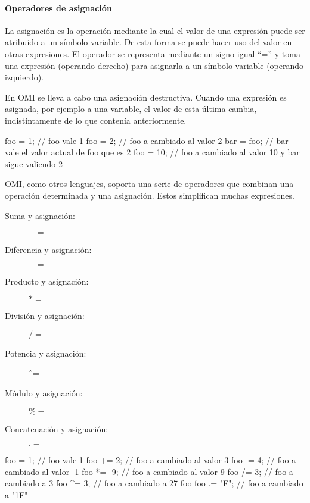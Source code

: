 \paragraph{Operadores de asignación} \label{sec:op_asig}
La asignación es la operación mediante la cual el valor de una expresión puede ser atribuido a un símbolo variable. De esta forma se puede hacer uso 
del valor en otras expresiones. El operador se representa mediante un signo igual ``='' y toma una expresión (operando derecho) para asignarla a un símbolo variable (operando izquierdo).
 

En OMI se lleva a cabo una asignación destructiva. Cuando una expresión es asignada, por ejemplo a una variable, el valor de esta última cambia, indistintamente de lo que contenía
anteriormente.\\

 \begin{myverbatim}
   foo = 1; // foo vale 1
   foo = 2; // foo a cambiado al valor 2
   bar = foo; // bar vale el valor actual de foo que es 2
   foo = 10; // foo a cambiado al valor 10 y bar sigue valiendo 2
\end{myverbatim} 

OMI, como otros lenguajes, soporta una serie de operadores que combinan una operación determinada y una asignación. Estos simplifican
muchas expresiones.

\begin{description}
\item [Suma y asignación:] $+=$
\item [Diferencia y asignación:] $-=$
\item [Producto y asignación:] $*=$
\item [División y asignación:] $/=$
\item [Potencia y asignación:] \^ \ =\hfill 
\item [Módulo y asignación:] $\%=$
\item [Concatenación y asignación:] $.=$
\end{description} 

 \begin{myverbatim}
   foo = 1; // foo vale 1
   foo += 2; // foo a cambiado al valor 3
   foo -= 4; // foo a cambiado al valor -1
   foo *= -9; // foo a cambiado al valor 9
   foo /= 3; // foo a cambiado a 3
   foo ^= 3; // foo a cambiado a 27
   foo %
   foo .= "F"; // foo a cambiado a "1F" 
\end{myverbatim} 


